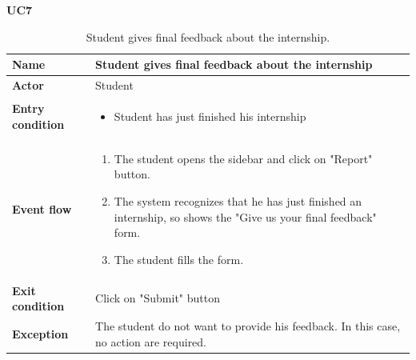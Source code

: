     \textbf{UC7}
    \nopagebreak
    \begin{table}[H]
        \centering
        \begin{tabular}{|l|p{11.9cm}|}
        \hline
        \textbf{Name}            & Student gives final feedback about the internship \\\hline
        \textbf{Actor}           & Student     \\\hline
        \textbf{Entry condition} &
        \begin{itemize}
              \item Student has just finished his internship
        \end{itemize}                                        \\\hline
        \textbf{Event flow}      &
        \begin{enumerate}[label=\arabic*.]
              \item The student opens the sidebar and click on "Report" button.
              \item The system recognizes that he has just finished an internship, so shows the "Give us your final feedback" form.
              \item The student fills the form.
              
        \end{enumerate}            \\\hline
        \textbf{Exit condition}  & Click on "Submit" button  \\\hline
        \textbf{Exception}       &  The student do not want to provide his feedback. In this case, no action are required.   \\\hline
        \end{tabular}
        \caption{Student gives final feedback about the internship.}
        \label{table:Student gives final feedback about the internship}
    \end{table}

